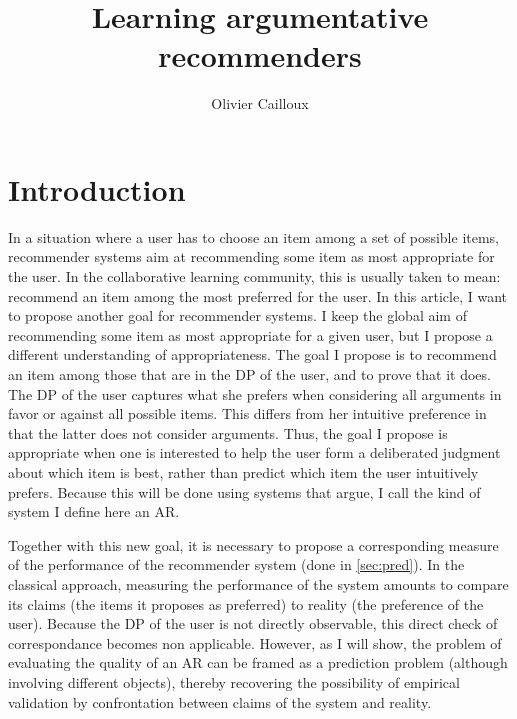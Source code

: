 \documentclass[french, english]{da2pl2018}
\begin{document}
\title{%
	Learning argumentative recommenders%
}
\author{Olivier Cailloux}
\makeatletter
\makeatother
\maketitle

\section{Introduction}
In a situation where a user has to choose an item among a set of possible items, recommender systems aim at recommending some item as most appropriate for the user.
In the collaborative learning community, this is usually taken to mean: recommend an item among the most preferred for the user. In this article, I want to propose another goal for recommender systems. I keep the global aim of recommending some item as most appropriate for a given user, but I propose a different understanding of appropriateness. The goal I propose is to recommend an item among those that are in the \ac{DP} of the user, and to prove that it does. The \ac{DP} of the user captures what she prefers when considering all arguments in favor or against all possible items. This differs from her intuitive preference in that the latter does not consider arguments. Thus, the goal I propose is appropriate when one is interested to help the user form a deliberated judgment about which item is best, rather than predict which item the user intuitively prefers. Because this will be done using systems that argue, I call the kind of system I define here an \ac{AR}.

Together with this new goal, it is necessary to propose a corresponding measure of the performance of the recommender system (done in \cref{sec:pred}). In the classical approach, measuring the performance of the system amounts to compare its claims (the items it proposes as preferred) to reality (the preference of the user). Because the \ac{DP} of the user is not directly observable, this direct check of correspondance becomes non applicable. However, as I will show, the problem of evaluating the quality of an \ac{AR} can be framed as a prediction problem (although involving different objects), thereby recovering the possibility of empirical validation by confrontation between claims of the system and reality.
\end{document}

